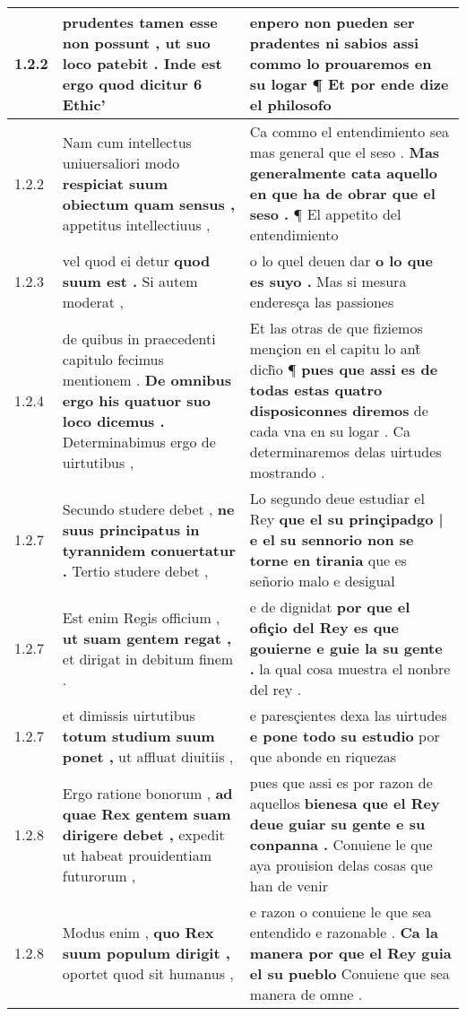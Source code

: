 \begin{tabular}{|p{1cm}|p{6.5cm}|p{6.5cm}|}
1.2.2 & prudentes tamen esse non possunt , \textbf{ ut suo loco patebit . } Inde est ergo quod dicitur 6 Ethic’ & enpero non pueden ser pradentes ni sabios \textbf{ assi commo lo prouaremos en su logar ¶ } Et por ende dize el philosofo \\\hline
1.2.2 & Nam cum intellectus uniuersaliori modo \textbf{ respiciat suum obiectum quam sensus , } appetitus intellectiuus , & Ca commo el entendimiento sea mas general que el seso . \textbf{ Mas generalmente cata aquello en que ha de obrar que el seso . } ¶ El appetito del entendimiento \\\hline
1.2.3 & vel quod ei detur \textbf{ quod suum est . } Si autem moderat , & o lo quel deuen dar \textbf{ o lo que es suyo . } Mas si mesura enderesça las passiones \\\hline
1.2.4 & de quibus in praecedenti capitulo fecimus mentionem . \textbf{ De omnibus ergo his quatuor suo loco dicemus . } Determinabimus ergo de uirtutibus , & Et las otras de que fiziemos mençion en el capitu lo ant̃ dich̃o ¶ \textbf{ pues que assi es de todas estas quatro disposiconnes diremos } de cada vna en su logar . Ca determinaremos delas uirtudes mostrando . \\\hline
1.2.7 & Secundo studere debet , \textbf{ ne suus principatus in tyrannidem conuertatur . } Tertio studere debet , & Lo segundo deue estudiar el Rey \textbf{ que el su prinçipadgo | e el su sennorio non se torne en tirania } que es señorio malo e desigual \\\hline
1.2.7 & Est enim Regis officium , \textbf{ ut suam gentem regat , } et dirigat in debitum finem . & e de dignidat \textbf{ por que el ofiçio del Rey es que gouierne e guie la su gente . } la qual cosa muestra el nonbre del rey . \\\hline
1.2.7 & et dimissis uirtutibus \textbf{ totum studium suum ponet , } ut affluat diuitiis , & e paresçientes dexa las uirtudes \textbf{ e pone todo su estudio } por que abonde en riquezas \\\hline
1.2.8 & Ergo ratione bonorum , \textbf{ ad quae Rex gentem suam dirigere debet , } expedit ut habeat prouidentiam futurorum , & pues que assi es por razon de aquellos \textbf{ bienesa que el Rey deue guiar su gente e su conpanna . } Conuiene le que aya prouision delas cosas que han de venir \\\hline
1.2.8 & Modus enim , \textbf{ quo Rex suum populum dirigit , } oportet quod sit humanus , & e razon o conuiene le que sea entendido e razonable . \textbf{ Ca la manera por que el Rey guia el su pueblo } Conuiene que sea manera de omne . \\\hline

\end{tabular}
